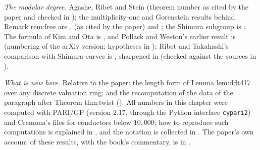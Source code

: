 \emph{The modular degree.} Agashe, Ribet and Stein \cite[Theorem 2.2]{ARS12} (theorem number as cited by the paper and checked in ); the multiplicity-one and Gorenstein results
behind Remark rem:free are \cite{Mazur77}, \cite[Theorem 3.5]{RibetStein} (as cited by the paper) and \cite{Tilouine97}; the Shimura subgroup is \cite{LingOesterle,Ribet88}. The formula of Kim and Ota
is \cite[Theorem 1.3]{KimOta}, and Pollack and Weston's earlier result is \cite[Theorem 6.11]{PollackWeston11} (numbering of the arXiv version; hypotheses in ); Ribet and Takahashi's comparison with Shimura curves is \cite[Theorems 1 and 2]{RibetTakahashi97}, sharpened in \cite[Theorem 3.2, Corollary 3.5]{Takahashi01}
(checked against the sources in ).

\emph{What is new here.} Relative to the paper: the length form of Lemma lem:ddt417 over any discrete valuation ring; and the recomputation of the data of the paragraph after Theorem thm:twist
(). All numbers in this chapter were computed with PARI/GP \cite{PARI} (version 2.17, through the Python interface \texttt{cypari2}) and Cremona's files
\cite{ecdata} for conductors below $10{,}000$; how to reproduce such computations is explained in , and the notation is collected in . The paper's own
account of these results, with the book's commentary, is in .
